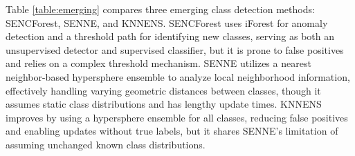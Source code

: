         Table \ref{table:emerging} compares three emerging class detection methods: SENCForest, SENNE, and KNNENS. SENCForest uses iForest \cite{wang2010negative} for anomaly detection and a threshold path for identifying new classes, serving as both an unsupervised detector and supervised classifier, but it is prone to false positives and relies on a complex threshold mechanism. SENNE utilizes a nearest neighbor-based hypersphere ensemble to analyze local neighborhood information, effectively handling varying geometric distances between classes, though it assumes static class distributions and has lengthy update times. KNNENS improves by using a hypersphere ensemble for all classes, reducing false positives and enabling updates without true labels, but it shares SENNE's limitation of assuming unchanged known class distributions.
\begin{table}[!ht]


\end{table}
